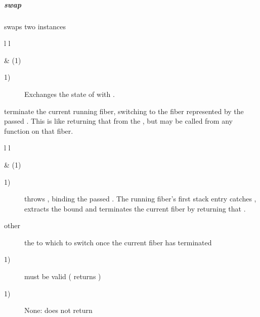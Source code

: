 \subparagraph*{swap}
swaps two \fiber instances\\

\begin{tabular}{ l l }
    \midrule

     & (1)\\

    \midrule
\end{tabular}

\begin{description}
    \item[1)] Exchanges the state of  with .\\
\end{description}



terminate the current running fiber, switching to the fiber represented by
the passed \fiber. This is like returning that \fiber from the \entryfn, but may
be called from any function on that fiber.

\begin{tabular}{ l l }
    \midrule

     & (1)\\

    \midrule
\end{tabular}

\begin{description}
    \item[1)] throws \unwindex, binding the passed \fiber. The running fiber's
              first stack entry catches \unwindex, extracts the bound \fiber
              and terminates the current fiber by returning that \fiber.
\end{description}

\begin{description}
    \item[other] the \fiber to which to switch once the current fiber has terminated
\end{description}

\begin{description}
    \item[1)]  must be valid ( returns )
\end{description}

\begin{description}
    \item[1)] None: \unwindcont does not return
\end{description}


